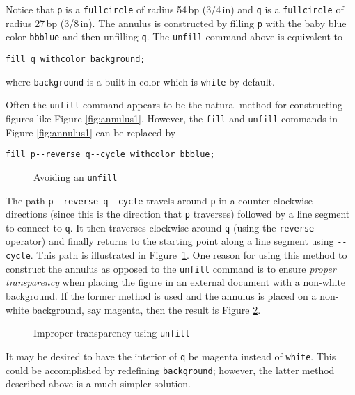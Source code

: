 Notice that \texttt{p} is a \texttt{fullcircle} of radius 54\,bp
(3/4\,in) and \texttt{q} is a \texttt{fullcircle} of radius 27\,bp
(3/8\,in).  The annulus is constructed by filling \texttt{p} with the
baby blue color \texttt{bbblue} and then unfilling \texttt{q}.  The
\texttt{unfill} command above is equivalent to

\begin{center}
  \verb|fill q withcolor background;|
\end{center}

where \texttt{background} is a built-in color which is \texttt{white} by
default.

Often the \texttt{unfill} command appears to be the natural method for
constructing figures like Figure \ref{fig:annulus1}.  However, the
\texttt{fill} and \texttt{unfill} commands in Figure \ref{fig:annulus1}
can be replaced by

\begin{center}
  \verb|fill p--reverse q--cycle withcolor bbblue;|
\end{center}

\begin{figure}[hptb]
	\begin{center}
  \end{center}
	\caption{Avoiding an \texttt{unfill}}
  \label{fig:annulus2}
\end{figure}

The path \verb|p--reverse q--cycle| travels around \texttt{p} in a
counter-clockwise directions (since this is the direction that
\texttt{p} traverses) followed by a line segment to connect to
\texttt{q}.  It then traverses clockwise around \texttt{q} (using the
\texttt{reverse} operator) and finally returns to the starting point
along a line segment using \texttt{-{}-cycle}.  This path is illustrated
in Figure~\ref{fig:annulus2}.  One reason for using this method to
construct the annulus as opposed to the \texttt{unfill} command is to
ensure \textit{proper transparency} when placing the figure in an
external document with a non-white background.  If the former method is
used and the annulus is placed on a non-white background, say magenta,
then the result is Figure \ref{fig:annulus3}.

\begin{figure}[ht]
	\begin{center}
  \end{center}
	\caption{Improper transparency using \texttt{unfill}}
  \label{fig:annulus3}
\end{figure}

It may be desired to have the interior of \texttt{q} be magenta instead
of \texttt{white}.  This could be accomplished by redefining
\texttt{background}; however, the latter method described above is a
much simpler solution.
